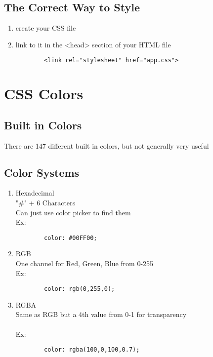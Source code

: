 \documentclass{article}
\begin{document}
	\subsection{The Correct Way to Style}
	\begin{enumerate}
		\item create your CSS file
		\item link to it in the <head> section of your HTML file
		\begin{verbatim}
	    <link rel="stylesheet" href="app.css">
		\end{verbatim}
	\end{enumerate}
	
\section{CSS Colors}
	
	\subsection{Built in Colors}
	There are 147 different built in colors, but not generally very useful
	
	\subsection{Color Systems}
	\begin{enumerate}
		\item Hexadecimal
		\\"\#" + 6 Characters\\Can just use color picker to find them\\Ex: \begin{verbatim}
		color: #00FF00;
		\end{verbatim}
		\item RGB
		\\One channel for Red, Green, Blue from 0-255\\Ex: \begin{verbatim}
		color: rgb(0,255,0);
		\end{verbatim}
		\item RGBA
		\\Same as RGB but a 4th value from 0-1 for transparency\\
		\\Ex: \begin{verbatim}
		color: rgba(100,0,100,0.7);
		\end{verbatim}
	\end{enumerate}
\end{document}
